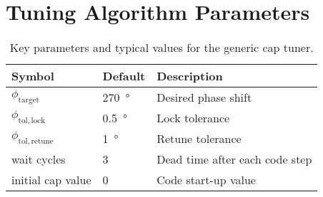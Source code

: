 \section{Tuning Algorithm Parameters}
\label{app:tuner_params}

\begin{table}[htbp]
  \centering
  \caption{Key parameters and typical values for the generic cap tuner.}
  \label{tab:tuner_params}
  \begin{tabular}{lll}
    \hline
    Symbol & Default & Description \\
    \hline
    $\phi_\mathrm{target}$     & \SI{270}{\degree} & Desired phase shift \\
    $\phi_\mathrm{tol,lock}$   & \SI{0.5}{\degree} & Lock tolerance \\
    $\phi_\mathrm{tol,retune}$ & \SI{1}{\degree}   & Retune tolerance \\
    wait cycles                  & 3                  & Dead time after each code step \\
    initial cap value            & 0                  & Code start-up value \\
    \hline
  \end{tabular}
\end{table}

